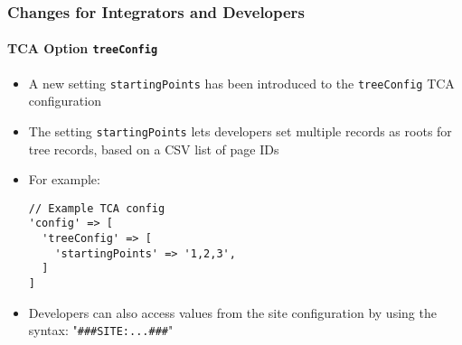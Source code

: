 %

\begin{frame}[fragile]
	\frametitle{Changes for Integrators and Developers}
	\framesubtitle{TCA Option \texttt{treeConfig}}


	\begin{itemize}
		\item A new setting \texttt{startingPoints} has been introduced to the
			\texttt{treeConfig} TCA configuration
		\item The setting \texttt{startingPoints} lets developers set multiple
			records as roots for tree records, based on a CSV list of page IDs
		\item For example:
\begin{lstlisting}
// Example TCA config
'config' => [
  'treeConfig' => [
    'startingPoints' => '1,2,3',
  ]
]
\end{lstlisting}
		\item Developers can also access values from the site configuration by
		 	using the syntax: \small"\texttt{\#\#\#SITE:...\#\#\#}"\normalsize
	\end{itemize}

\end{frame}

